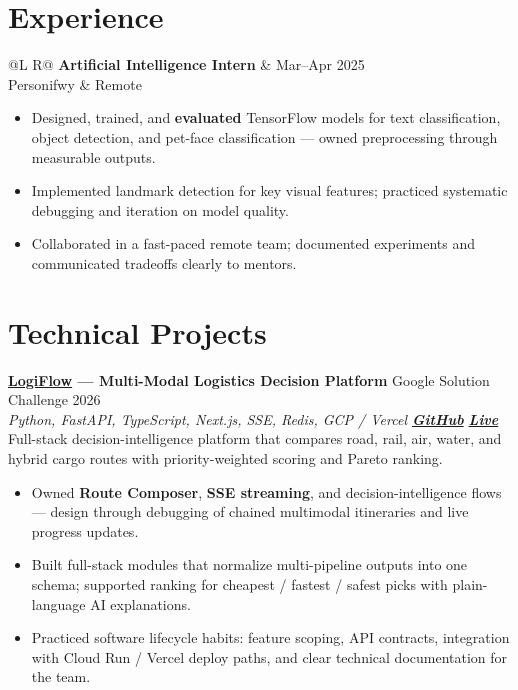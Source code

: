 \documentclass[a4paper,10pt]{article}
\makeatletter
\newcommand{\entry}[4]{%
  \vspace{0.5mm}
  \noindent\begin{tabularx}{\textwidth}{@{}L R@{}}
    \textbf{#1} & {\small #2} \\
    {\small #3} & {\small #4} \\
  \end{tabularx}\par
}
\makeatother
\begin{document}
\section{Experience}
\entry{Artificial Intelligence Intern}{Mar--Apr 2025}{Personifwy}{Remote}
\begin{itemize}
  \item Designed, trained, and \textbf{evaluated} TensorFlow models for text classification, object detection, and pet-face classification --- owned preprocessing through measurable outputs.
  \item Implemented landmark detection for key visual features; practiced systematic debugging and iteration on model quality.
  \item Collaborated in a fast-paced remote team; documented experiments and communicated tradeoffs clearly to mentors.
\end{itemize}

\section{Technical Projects}
\vspace{0.6mm}
\noindent\textbf{\href{https://github.com/KARANBHAI029/LOGIFLOW}{LogiFlow} --- Multi-Modal Logistics Decision Platform}
\hfill {\small Google Solution Challenge 2026}\\
\textit{\small Python, FastAPI, TypeScript, Next.js, SSE, Redis, GCP / Vercel \textbar{}
\href{https://github.com/KARANBHAI029/LOGIFLOW}{\textbf{GitHub}} \textbar{}
\href{https://logi-flow-solution-challenge-2026.vercel.app/}{\textbf{Live}}}\\[0.4mm]
Full-stack decision-intelligence platform that compares road, rail, air, water, and hybrid cargo routes with priority-weighted scoring and Pareto ranking.
\begin{itemize}
  \item Owned \textbf{Route Composer}, \textbf{SSE streaming}, and decision-intelligence flows --- design through debugging of chained multimodal itineraries and live progress updates.
  \item Built full-stack modules that normalize multi-pipeline outputs into one schema; supported ranking for cheapest / fastest / safest picks with plain-language AI explanations.
  \item Practiced software lifecycle habits: feature scoping, API contracts, integration with Cloud Run / Vercel deploy paths, and clear technical documentation for the team.
\end{itemize}
\end{document}

